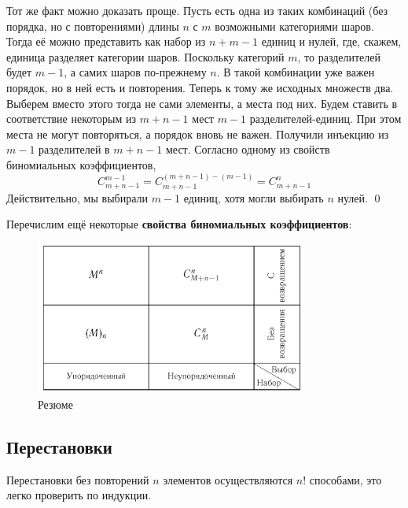 Тот же факт можно доказать проще. Пусть есть одна из таких комбинаций (без
порядка, но с повторениями) длины $ n $ с $ m $ возможными категориями шаров.
Тогда её можно представить как набор из $ n + m - 1$ единиц и нулей,
где, скажем, единица разделяет категории шаров. Поскольку категорий $ m $, то
разделителей будет $ m-1 $, а самих шаров по-прежнему $ n $. В такой комбинации
уже важен порядок, но в ней есть и повторения. Теперь к тому же исходных
множеств два. Выберем вместо этого тогда не сами элементы, а места под них.
Будем ставить в соответствие некоторым из $ m+n-1 $ мест $ m - 1 $
разделителей-единиц. При этом места не могут повторяться, а порядок вновь не
важен. Получили инъекцию из $ m-1 $ разделителей в $ m+n-1 $ мест. Согласно
одному из свойств биномиальных коэффициентов,  
\[
	C^{m-1}_{m+n-1} = C^{(m+n-1)-(m-1)}_{m+n-1} = C^n_{m+n-1}
\]
Действительно, мы выбирали $ m-1 $ единиц, хотя могли выбирать $ n $ нулей.
\qed



Перечислим ещё некоторые \textbf{свойства биномиальных коэффициентов}:

\begin{figure}[h!]
	\centering
	\includegraphics[width=0.8\textwidth]{Figures/table-1.png}
	\caption{Резюме}
	\label{fig:table-1}
\end{figure}


\subsection{Перестановки}
Перестановки без повторений $ n $ элементов осуществляются $ n! $ способами, это
легко проверить по индукции. 


